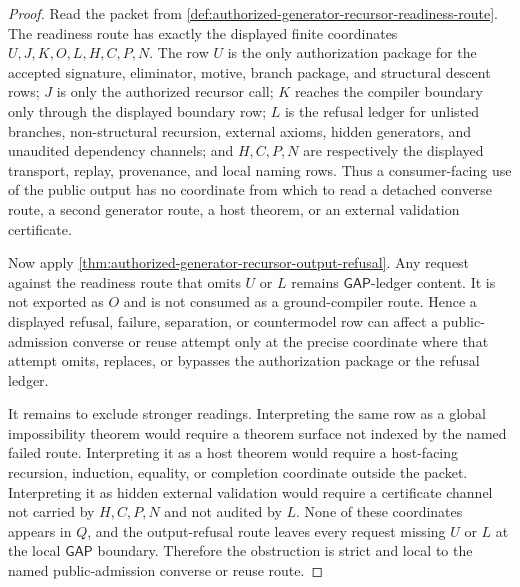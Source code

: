 \begin{proof}
Read the packet from \autoref{def:authorized-generator-recursor-readiness-route}.
The readiness route has exactly the displayed finite coordinates
$U,J,K,O,L,H,C,P,N$. The row $U$ is the only authorization package for the
accepted signature, eliminator, motive, branch package, and structural descent
rows; $J$ is only the authorized recursor call; $K$ reaches the compiler
boundary only through the displayed boundary row; $L$ is the refusal ledger for
unlisted branches, non-structural recursion, external axioms, hidden
generators, and unaudited dependency channels; and $H,C,P,N$ are respectively
the displayed transport, replay, provenance, and local naming rows. Thus a
consumer-facing use of the public output has no coordinate from which to read a
detached converse route, a second generator route, a host theorem, or an
external validation certificate.

Now apply \autoref{thm:authorized-generator-recursor-output-refusal}. Any
request against the readiness route that omits $U$ or $L$ remains
$\mathsf{GAP}$-ledger content. It is not exported as $O$ and is not consumed as
a ground-compiler route. Hence a displayed refusal, failure, separation, or
countermodel row can affect a public-admission converse or reuse attempt only
at the precise coordinate where that attempt omits, replaces, or bypasses the
authorization package or the refusal ledger.

It remains to exclude stronger readings. Interpreting the same row as a global
impossibility theorem would require a theorem surface not indexed by the named
failed route. Interpreting it as a host theorem would require a host-facing
recursion, induction, equality, or completion coordinate outside the packet.
Interpreting it as hidden external validation would require a certificate
channel not carried by $H,C,P,N$ and not audited by $L$. None of these
coordinates appears in $Q$, and the output-refusal route leaves every request
missing $U$ or $L$ at the local $\mathsf{GAP}$ boundary. Therefore the
obstruction is strict and local to the named public-admission converse or reuse
route.
\end{proof}
